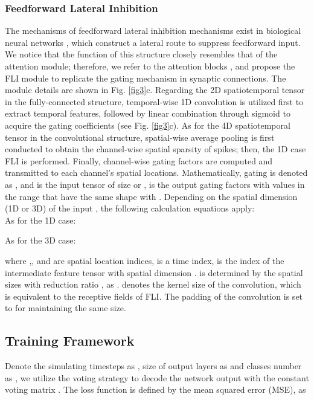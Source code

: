 \documentclass[letterpaper]{article} \usepackage[submission]{aaai23}  \usepackage{times}  \usepackage{helvet}  \usepackage{courier}  \usepackage[hyphens]{url}  \usepackage{graphicx} \urlstyle{rm} \def\UrlFont{\rm}  \usepackage{natbib}  \usepackage{caption} \frenchspacing  \setlength{\pdfpagewidth}{8.5in} \setlength{\pdfpageheight}{11in} \usepackage{algorithm}
\begin{document}
\subsubsection{Feedforward Lateral Inhibition}
The mechanisms of feedforward lateral inhibition mechanisms exist in biological neural networks \cite{luo_architectures_nodate}, which construct a lateral route to suppress feedforward input. We notice that the function of this structure closely resembles that of the attention module; therefore, we refer to the attention blocks \cite{hu_squeeze-and-excitation_2018,yao_temporal-wise_2021,zhu_tcja-snn_2022}, and propose the FLI module to replicate the gating mechanism in synaptic connections.
The module details are shown in Fig. \ref{fig3}c. 
Regarding the 2D spatiotemporal tensor in the fully-connected structure, temporal-wise 1D convolution is utilized first to extract temporal features, followed by linear combination through sigmoid to acquire the gating coefficients (see Fig. \ref{fig3}c).
As for the 4D spatiotemporal tensor in the convolutional structure, spatial-wise average pooling is first conducted to obtain the channel-wise spatial sparsity of spikes; then, the 1D case FLI is performed. Finally, channel-wise gating factors are computed and transmitted to each channel's spatial locations.
Mathematically, gating is denoted as , and  is the input tensor of size  or ,  is the output gating factors with values in the range  that have the same shape with . Depending on the spatial dimension (1D or 3D) of the input , the following calculation equations apply:\\
As for the 1D case:


As for the 3D case:



where ,, and  are spatial location indices,  is a time index,  is the index of the intermediate feature tensor  with spatial dimension .  is determined by the spatial sizes  with reduction ratio , as .  denotes the kernel size of the convolution, which is equivalent to the receptive fields of FLI. The padding of the convolution is set to  for maintaining the same size.

\subsection{Training Framework}
Denote the simulating timesteps as , size of output layers as  and classes number as , we utilize the voting strategy \cite{wu_direct_2019} to decode the network output  with the constant voting matrix . The loss function is defined by the mean squared error (MSE), as
\end{document}
